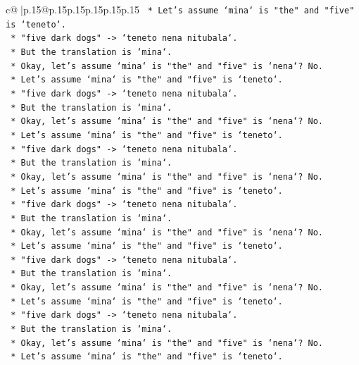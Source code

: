 \documentclass{article}
\begin{document}
{\begin{supertabular}{c@{$\;$}|p{.15\linewidth}@{}p{.15\linewidth}p{.15\linewidth}p{.15\linewidth}p{.15\linewidth}p{.15\linewidth}}
{{{\texttt{    *   Let's assume `mina` is "the" and "five" is `teneto`.} \\
\texttt{    *   "five dark dogs" {-}> `teneto nena nitubala`.} \\
\texttt{    *   But the translation is `mina`.} \\
\texttt{    *   Okay, let's assume `mina` is "the" and "five" is `nena`? No.} \\
\texttt{    *   Let's assume `mina` is "the" and "five" is `teneto`.} \\
\texttt{    *   "five dark dogs" {-}> `teneto nena nitubala`.} \\
\texttt{    *   But the translation is `mina`.} \\
\texttt{    *   Okay, let's assume `mina` is "the" and "five" is `nena`? No.} \\
\texttt{    *   Let's assume `mina` is "the" and "five" is `teneto`.} \\
\texttt{    *   "five dark dogs" {-}> `teneto nena nitubala`.} \\
\texttt{    *   But the translation is `mina`.} \\
\texttt{    *   Okay, let's assume `mina` is "the" and "five" is `nena`? No.} \\
\texttt{    *   Let's assume `mina` is "the" and "five" is `teneto`.} \\
\texttt{    *   "five dark dogs" {-}> `teneto nena nitubala`.} \\
\texttt{    *   But the translation is `mina`.} \\
\texttt{    *   Okay, let's assume `mina` is "the" and "five" is `nena`? No.} \\
\texttt{    *   Let's assume `mina` is "the" and "five" is `teneto`.} \\
\texttt{    *   "five dark dogs" {-}> `teneto nena nitubala`.} \\
\texttt{    *   But the translation is `mina`.} \\
\texttt{    *   Okay, let's assume `mina` is "the" and "five" is `nena`? No.} \\
\texttt{    *   Let's assume `mina` is "the" and "five" is `teneto`.} \\
\texttt{    *   "five dark dogs" {-}> `teneto nena nitubala`.} \\
\texttt{    *   But the translation is `mina`.} \\
\texttt{    *   Okay, let's assume `mina` is "the" and "five" is `nena`? No.} \\
\texttt{    *   Let's assume `mina` is "the" and "five" is `teneto`.} \\
}}}
\end{supertabular}}
\end{document}

